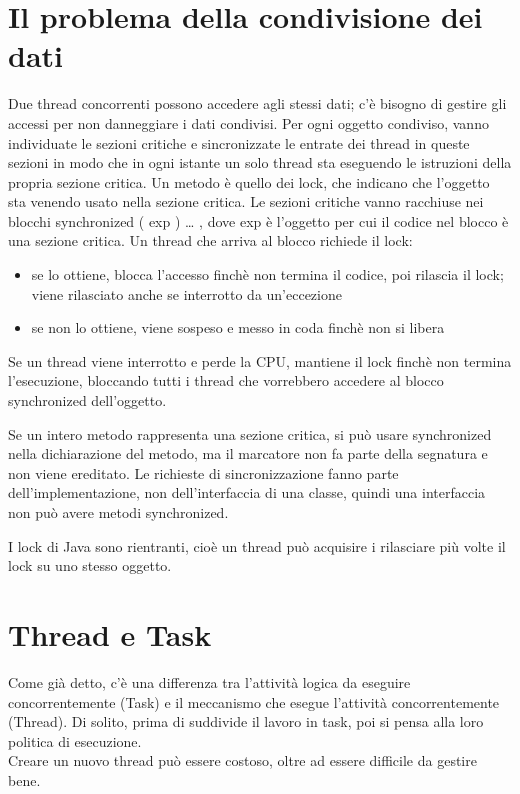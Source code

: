 \section{Il problema della condivisione dei dati}
Due thread concorrenti possono accedere agli stessi dati; c'è bisogno di gestire gli accessi per non danneggiare i dati condivisi. Per ogni oggetto condiviso, vanno individuate le sezioni critiche e sincronizzate le entrate dei thread in queste sezioni in modo che in ogni istante un solo thread sta eseguendo le istruzioni della propria sezione critica.
Un metodo è quello dei lock, che indicano che l'oggetto sta venendo usato nella sezione critica.
Le sezioni critiche vanno racchiuse nei blocchi synchronized ( exp ) { … }, dove exp è l'oggetto per cui il codice nel blocco è una sezione critica.
Un thread che arriva al blocco richiede il lock:
\begin{itemize}
\item se lo ottiene, blocca l'accesso finchè non termina il codice, poi rilascia il lock; viene rilasciato anche se interrotto da un'eccezione
\item se non lo ottiene, viene sospeso e messo in coda finchè non si libera
\end{itemize}
Se un thread viene interrotto e perde la CPU, mantiene il lock finchè non termina l'esecuzione, bloccando tutti i thread che vorrebbero accedere al blocco synchronized dell'oggetto.

Se un intero metodo rappresenta una sezione critica, si può usare synchronized nella dichiarazione del metodo, ma il marcatore non fa parte della segnatura e non viene ereditato. Le richieste di sincronizzazione fanno parte dell'implementazione, non dell'interfaccia di una classe, quindi una interfaccia non può avere metodi synchronized.

I lock di Java sono rientranti, cioè un thread può acquisire i rilasciare più volte il lock su uno stesso oggetto.

\section{Thread e Task}
Come già detto, c'è una differenza tra l'attività logica da eseguire concorrentemente (Task) e il meccanismo che esegue l'attività concorrentemente (Thread). Di solito, prima di suddivide il lavoro in task, poi si pensa alla loro politica di esecuzione. \\
Creare un nuovo thread può essere costoso, oltre ad essere difficile da gestire bene. 